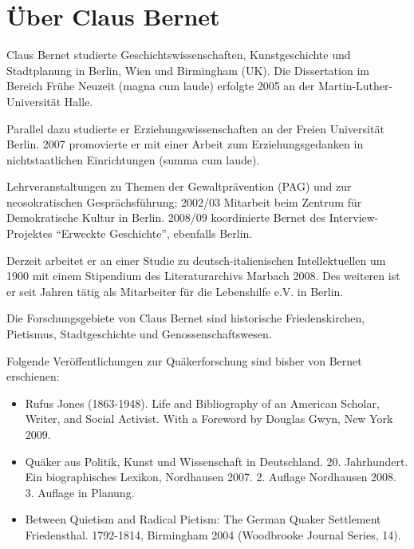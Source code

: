 \pagebreak


\section{Über Claus Bernet}
\begin{footnotesize}

Claus Bernet studierte Geschichtswissenschaften, Kunstgeschichte und
Stadtplanung in Berlin, Wien und Birmingham (UK). Die Dissertation im Bereich Frühe Neuzeit (magna cum laude)
erfolgte 2005 an der Martin-Luther-Universität Halle.

\medskip

Parallel dazu studierte er Erziehungswissenschaften an der Freien Universität Berlin.
2007 promovierte er mit einer Arbeit zum Erziehungsgedanken in nichtstaatlichen
Einrichtungen (summa cum laude).

\medskip

Lehrveranstaltungen zu Themen der Gewaltprävention (PAG) und zur neosokratischen
Gesprächsführung; 2002/03 Mitarbeit beim Zentrum für Demokratische Kultur in
Berlin. 2008/09 koordinierte Bernet des Interview-Projektes "`Erweckte
Geschichte"', ebenfalls Berlin.

\medskip

Derzeit arbeitet er an einer Studie zu deutsch-italienischen Intellektuellen um
1900 mit einem Stipendium des Literaturarchivs Marbach 2008. Des weiteren ist er
seit Jahren tätig als Mitarbeiter für die Lebenshilfe e.V. in Berlin.

\medskip

Die Forschungsgebiete von Claus Bernet sind historische Friedenskirchen,
Pietismus, Stadtgeschichte und Genossenschaftswesen.

\medskip

Folgende Veröffentlichungen zur Quäkerforschung sind bisher von Bernet
erschienen:

\begin{itemize}
 \item Rufus Jones (1863-1948). Life and Bibliography of an American Scholar,
Writer, and Social Activist. With a Foreword by Douglas Gwyn, New York 2009.
 \item Quäker aus Politik, Kunst und Wissenschaft in Deutschland. 20.
Jahrhundert. Ein biographisches Lexikon, Nordhausen 2007. 2. Auflage Nordhausen
2008. 3. Auflage in Planung.
 \item Between Quietism and Radical Pietism: The German Quaker Settlement
Friedensthal. 1792-1814, Birmingham 2004 (Woodbrooke Journal Series, 14).
\end{itemize}


\end{footnotesize}
